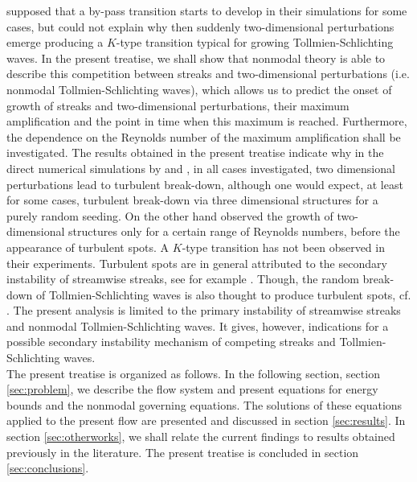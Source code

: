 \documentclass{jfm}
\begin{document}
\citet{OzdemirHsuBalachandar2013} supposed that a by-pass transition starts to develop 
in their simulations for some cases, but could not explain why 
then suddenly two-dimensional perturbations emerge
producing a $ K $-type transition typical for growing
Tollmien-Schlichting waves.
In the present treatise, we shall show that nonmodal theory is
able to describe this competition between streaks and
two-dimensional perturbations (i.e. nonmodal Tollmien-Schlichting waves),
which allows us to predict the onset of growth of streaks and
two-dimensional perturbations, their maximum amplification
and the point in time when this maximum is reached. 
Furthermore, the dependence on the Reynolds number
of the maximum amplification shall be investigated. 
The results obtained in the present treatise indicate
why in
the direct numerical simulations
by \citet{VittoriBlondeaux2008,VittoriBlondeaux2011}
and \citet{OzdemirHsuBalachandar2013},
in all cases investigated, two dimensional perturbations lead to turbulent
break-down, although one would expect, at least
for some cases, turbulent break-down via three dimensional structures
for a purely random seeding. On the other hand
\citet{SumerJensenSorensenFredsoeLiuCarstensen2010}
observed the growth of two-dimensional
structures only for a certain range of Reynolds numbers,
before the appearance of turbulent spots. A $K$-type
transition has not been observed in their experiments. 
Turbulent spots are in general attributed to 
the secondary instability of streamwise streaks,
see for example \citep{AnderssonBrandtBottaroHenningson2001,
BrandtSchlatterHenningson2004}.
Though,
the random break-down of Tollmien-Schlichting
waves is also thought to produce turbulent spots,
cf. \citep{ShaikhGaster1994,Gaster2016}.
The present analysis is limited to the primary
instability of streamwise streaks and nonmodal Tollmien-Schlichting
waves. It gives, however, indications for a possible
secondary instability mechanism of competing streaks
and Tollmien-Schlichting waves. \\

The present treatise is organized as follows. In the following
section, section \ref{sec:problem}, we describe the flow system
and present equations for energy bounds and the nonmodal governing
equations. The solutions of these equations applied to 
the present flow are presented and discussed in section
\ref{sec:results}. In section \ref{sec:otherworks}, we shall relate the
current findings to results obtained previously in the literature. 
The present treatise is concluded in section \ref{sec:conclusions}. 
\end{document}
